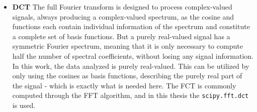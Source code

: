 \documentclass[../../CompleteThesis2/Complete_2ndDraft]{subfiles}
\begin{document}
\begin{itemize}
	\item \textbf{DCT} The full Fourier transform is designed to process complex-valued signals, always producing a complex-valued spectrum, as the cosine and functions each contain individual information of the spectrum and constitute a complete set of basis functions. But a purely real-valued signal has a symmetric Fourier spectrum, meaning that it is only necessary to compute	half the number of spectral coefficients, without losing any signal information. In this work, the data analyzed is purely real-valued. This can be utilized by only using the cosines as basis functions, describing the purely real part of the signal - which is exactly what is needed here. The FCT is commonly computed through the FFT algorithm, and in this thesis the \lstinline[language=python]|scipy.fft.dct| is used.
	
	
	

\end{itemize}
\end{document}
